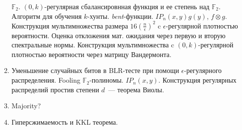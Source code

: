 \begin{enumerate}
        $\mathbb{F}_2$. $(0, k)$-регулярная сбалансировнная функция и ее степень над $\mathbb{F}_2$. Алгоритм для обучения
        $k$-хунты. \textit{bent}-функции. $IP_n(x, y) g(y)$, $f \otimes g$. Конструкция мультимножества размера $16
        (\frac{n}{\epsilon})^2$ c $\epsilon$-регулярной плотностью вероятности. Оценка откложения мат. ожидания через первую и
        вторую спектральные нормы. Конструкция мультимножества c $(0, k)$-регулярной плотностью вероятности через матрицу
        Вандермонта.
    \item Уменьшение случайных битов в BLR-тесте при помощи $\epsilon$-регулярного распределения. Fooling
        $\mathbb{F}_2$-полиномы. $IP_n(x, y)$. Конструкция регулярных распределий простив степени $d$~--- теорема Виолы.
    \item Majority?
    \item Гиперсжимаемость и KKL теорема.
\end{enumerate}